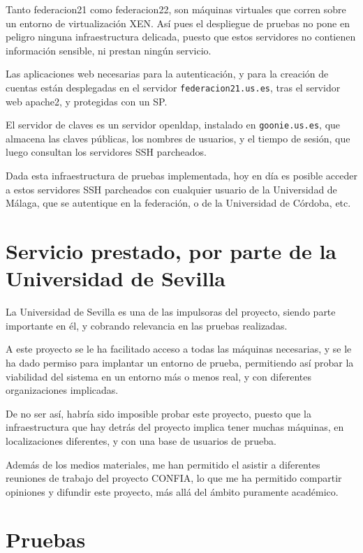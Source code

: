     Tanto federacion21 como federacion22, son máquinas virtuales que corren
    sobre un entorno de virtualización XEN. Así pues el despliegue de
    pruebas no pone en peligro ninguna infraestructura delicada, puesto que
    estos servidores no contienen información sensible, ni prestan ningún
    servicio.

    Las aplicaciones web necesarias para la autenticación, y para la
    creación de cuentas están desplegadas en el servidor
    \texttt{federacion21.us.es}, tras el servidor web apache2, y protegidas
    con un SP.

    El servidor de claves es un servidor openldap, instalado en
    \texttt{goonie.us.es}, que almacena las claves públicas, los nombres de
    usuarios, y el tiempo de sesión, que luego consultan los servidores SSH
    parcheados.

    Dada esta infraestructura de pruebas implementada, hoy en día es posible
    acceder a estos servidores SSH parcheados con cualquier usuario de la
    Universidad de Málaga, que se autentique en la federación, o de la
    Universidad de Córdoba, etc.

\section{Servicio prestado, por parte de la Universidad de Sevilla}

    La Universidad de Sevilla es una de las impulsoras del proyecto, siendo
    parte importante en él, y cobrando relevancia en las pruebas
    realizadas.

    A este proyecto se le ha facilitado acceso a todas las máquinas
    necesarias, y se le ha dado permiso para implantar un entorno de
    prueba, permitiendo así probar la viabilidad del sistema en un entorno
    más o menos real, y con diferentes organizaciones implicadas.

    De no ser así, habría sido imposible probar este proyecto, puesto que
    la infraestructura que hay detrás del proyecto implica tener muchas
    máquinas, en localizaciones diferentes, y con una base de usuarios de
    prueba.

    Además de los medios materiales, me han permitido el asistir a
    diferentes reuniones de trabajo del proyecto CONFIA, lo que me ha
    permitido compartir opiniones y difundir este proyecto, más allá del
    ámbito puramente académico.

\section{Pruebas}

